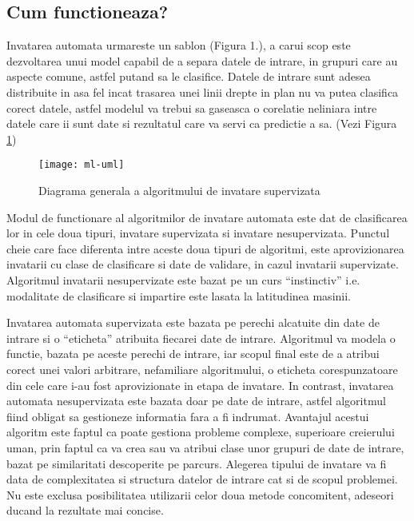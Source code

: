 	
	\subsection{Cum functioneaza?}
	Invatarea automata urmareste un sablon (Figura 1.), a carui scop este dezvoltarea unui model capabil de a separa datele de intrare, in grupuri care au aspecte comune, astfel putand sa le clasifice. Datele de intrare sunt adesea distribuite in asa fel incat trasarea unei linii drepte in plan nu va putea clasifica corect datele, astfel  modelul va trebui sa gaseasca o corelatie neliniara intre datele care ii sunt date si rezultatul care va servi ca predictie a sa. (Vezi Figura \ref{fig:uml-diagram})
	

	
	\begin{figure}[H]
		\texttt{[image: ml-uml]}  
		\caption{\label{fig:uml-diagram} Diagrama generala a algoritmului de invatare supervizata
		\protect
		\footnotemark}
	\end{figure}


	\newpage
	
	Modul de functionare al algoritmilor de invatare automata este dat de clasificarea lor in cele doua tipuri, invatare supervizata si invatare nesupervizata. Punctul cheie care face diferenta intre aceste doua tipuri de algoritmi, este aprovizionarea invatarii cu clase de clasificare si date de validare, in cazul invatarii supervizate. Algoritmul invatarii nesupervizate este bazat pe un curs “instinctiv” i.e. modalitate de clasificare si impartire este lasata la latitudinea masinii.
	
	Invatarea automata supervizata este bazata pe perechi alcatuite din date de intrare si o “eticheta” atribuita fiecarei date de intrare. Algoritmul va modela o functie, bazata pe aceste perechi de intrare, iar scopul final este de a atribui corect unei valori arbitrare, nefamiliare algoritmului, o eticheta corespunzatoare din cele care i-au fost aprovizionate in etapa de invatare. 
	In contrast, invatarea automata nesupervizata este bazata doar pe date de intrare, astfel algoritmul fiind obligat sa gestioneze informatia fara a fi indrumat. Avantajul acestui algoritm este faptul ca poate gestiona probleme complexe, superioare creierului uman, prin faptul ca va crea sau va atribui clase unor grupuri de date de intrare, bazat pe similaritati descoperite pe parcurs.
	Alegerea tipului de invatare va fi data de complexitatea si structura  datelor de intrare cat si de scopul problemei. Nu este exclusa posibilitatea utilizarii celor doua metode concomitent, adeseori ducand la rezultate mai concise.
	
